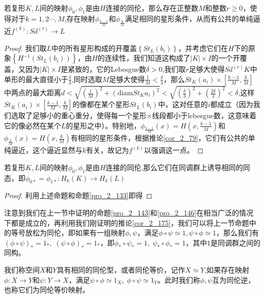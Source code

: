 \begin{proposition}
若复形$K,L$间的映射$\phi_{0},\phi_{1}$是由$H$连接的同伦，那么存在正整数$M$和整数$r\geq0$，使得对于$k=1,2\cdots,M$,存在映射$\phi_{\frac{k-1}{M}}$和$\phi_{\frac{k}{M}}$满足相同的星形条件，从而有公共的单纯逼近$f^{(k)}:Sd^{(r)}\rightarrow L$
\end{proposition}
\begin{proof}
我们取$L$中的所有星形构成的开覆盖$\left\{St_{L}(b_{i})\right\}$，并考虑它们在$H$下的原象$\left\{H^{-1}(St_{L}(b_{i}))\right\}$，由$H$的连续性，我们知道这构成了$|K|\times I$的一个开覆盖，又因为$|K|\times I$是紧致的，它的Lebesgue数$\delta>0$,我们取$r$足够大使得$Sd^{(r)}K$中单形的最大直径小于$\frac{\delta}{3}$,同时选取$M$足够大使得$\frac{1}{M}<\frac{\delta}{3}$，那么$St_{K}(a_{i})\times\left[\frac{k-1}{M},\frac{k}{M}\right]$中两点的最大距离$d<\sqrt{\left(\frac{1}{M}\right)^{2}+\left(\text{diam}St_{K}a_{i}\right)^{2}}<\sqrt{\left(\frac{\delta}{3}\right)^{2}+\left(\frac{2\delta}{3}\right)^{2}}<\delta$,这样$St_{K}(a_{i})\times\left[\frac{k-1}{M},\frac{k}{M}\right]$的像都在某个星形$St_{L}(b_{i})$中，这对任意的$i$都成立（因为我们选取了足够小的重心重分，使得每一个星形$\times$线段都小于lebesgue数，这意味着它的像必然在某个$L$的星形之中）。特别地，$\phi_{\frac{k-1}{M}}(x)=H(x,\frac{k-1}{M})$和$\phi_{\frac{k}{M}}(x)=H(x,\frac{k}{M})$有相同的星形条件，根据推论\eqref{cor_2_79}，它们有公共的单纯逼近，这个逼近显然与$k$有关，故记为$f^{(k)}$以强调这一点。
\end{proof}
\begin{corollary}\label{cor_2_175}
若复形$K,L$间的映射$\phi_{0},\phi_{1}$是由$H$连接的同伦,那么它们在同调群上诱导相同的同态，即$\phi_{0*}=\phi_{1*}:H_{k}(K)\rightarrow H_{k}(L)$
\end{corollary}
\begin{proof}
利用上述命题和命题\eqref{pro_2_133}即得
\end{proof}
注意到我们在上一节中证明的命题\eqref{pro_2_143}和\eqref{pro_2_146}在相当广泛的情况下都是成立的，再利用我们刚证明的推论\eqref{cor_2_175}，我们可以将上一节命题中的等号放松为同伦，即如果有一组映射$\phi,\psi$，满足$\phi\circ\psi\simeq1,\psi\circ\phi\simeq1$，那么我们有$(\phi\circ\psi)_{*}=1_{*},\;(\psi\circ\phi)_{*}=1_{*}$，即$\phi_{*}\circ\psi_{*}=1,\;\psi_{*}\circ\phi_{*}=1$，其中$1$是同调群之间的同构。
\begin{definition}\label{chap2_def_201}
我们称空间$X$和$Y$具有相同的同伦型，或者同伦等价，记作$X\simeq Y$,如果存在映射$\phi:X\rightarrow Y$和$\psi:Y\rightarrow X$，满足$\psi\circ\phi\simeq 1_{X},\;\phi\circ\psi\simeq 1_{Y}$。此时我们称$\phi,\psi$互为同伦逆，也称它们为同伦等价映射。
\end{definition}

